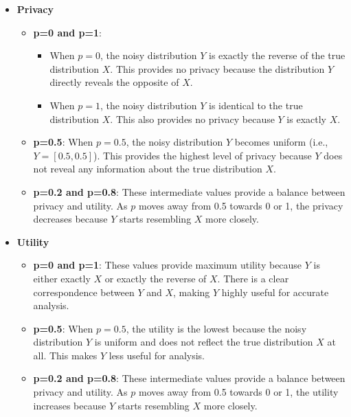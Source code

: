 \documentclass[a4 paper]{article}
\numberwithin{equation}{section}
\newcommand{\0}{\mathbf{0}}
\begin{document}
\begin{itemize}
    \item \textbf{Privacy}
    \begin{itemize}
        \item \textbf{p=0 and p=1}:
            \begin{itemize}
                \item When \(p=0\), the noisy distribution \( Y \) is exactly the reverse of the true distribution \( X \). This provides no privacy because the distribution \( Y \) directly reveals the opposite of \( X \).
                \item When \(p=1\), the noisy distribution \( Y \) is identical to the true distribution \( X \). This also provides no privacy because \( Y \) is exactly \( X \).
            \end{itemize}
        \item \textbf{p=0.5}:
            When \(p=0.5\), the noisy distribution \( Y \) becomes uniform (i.e., \( Y=[0.5,0.5] \)). This provides the highest level of privacy because \( Y \) does not reveal any information about the true distribution \( X \).
        \item \textbf{p=0.2 and p=0.8}:
            These intermediate values provide a balance between privacy and utility. As \( p \) moves away from 0.5 towards 0 or 1, the privacy decreases because \( Y \) starts resembling \( X \) more closely.
        \end{itemize}
    \item \textbf{Utility}
    \begin{itemize}
        \item \textbf{p=0 and p=1}:
            These values provide maximum utility because \( Y \) is either exactly \( X \) or exactly the reverse of \( X \). There is a clear correspondence between \( Y \) and \( X \), making \( Y \) highly useful for accurate analysis.
        \item \textbf{p=0.5}:
            When \(p=0.5\), the utility is the lowest because the noisy distribution \( Y \) is uniform and does not reflect the true distribution \( X \) at all. This makes \( Y \) less useful for analysis.
        \item \textbf{p=0.2 and p=0.8}:
            These intermediate values provide a balance between privacy and utility. As \( p \) moves away from 0.5 towards 0 or 1, the utility increases because \( Y \) starts resembling \( X \) more closely.
    \end{itemize}
\end{itemize}
\end{document}
